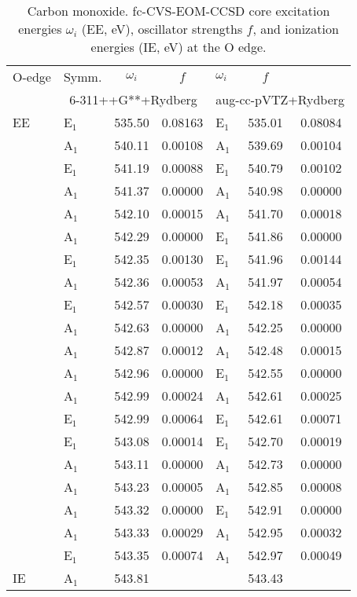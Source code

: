 \documentclass[journal=jctcce,manuscript=article]{achemso}
\begin{document}
\begin{table}
\caption{Carbon monoxide. fc-CVS-EOM-CCSD core excitation energies $\omega_i$ (EE, eV), oscillator strengths $f$, and ionization 
energies (IE, eV) at the O edge.
\label{Tab:CO}}
\scriptsize
\begin{tabular}{l|lcc|lcc}
\hline
O-edge & Symm. & $\omega_i$ & $f$ 
       & $\omega_i$ & $f$ \\
        \cline{2-7}
      & \multicolumn{3}{c|}{6-311++G**+Rydberg}
      & \multicolumn{3}{c}{aug-cc-pVTZ+Rydberg} \\

\hline
EE 
& E$_1$ & 535.50 & 0.08163 & E$_1$ & 535.01 & 0.08084 \\
& A$_1$ & 540.11 & 0.00108 & A$_1$ & 539.69 & 0.00104 \\
& E$_1$ & 541.19 & 0.00088 & E$_1$ & 540.79 & 0.00102 \\
& A$_1$ & 541.37 & 0.00000 & A$_1$ & 540.98 & 0.00000 \\
& A$_1$ & 542.10 & 0.00015 & A$_1$ & 541.70 & 0.00018 \\
& A$_1$ & 542.29 & 0.00000 & E$_1$ & 541.86 & 0.00000 \\
& E$_1$ & 542.35 & 0.00130 & E$_1$ & 541.96 & 0.00144 \\
& A$_1$ & 542.36 & 0.00053 & A$_1$ & 541.97 & 0.00054 \\
& E$_1$ & 542.57 & 0.00030 & E$_1$ & 542.18 & 0.00035 \\
& A$_1$ & 542.63 & 0.00000 & A$_1$ & 542.25 & 0.00000 \\
& A$_1$ & 542.87 & 0.00012 & A$_1$ & 542.48 & 0.00015 \\
& A$_1$ & 542.96 & 0.00000 & E$_1$ & 542.55 & 0.00000 \\
& A$_1$ & 542.99 & 0.00024 & A$_1$ & 542.61 & 0.00025 \\
& E$_1$ & 542.99 & 0.00064 & E$_1$ & 542.61 & 0.00071 \\
& E$_1$ & 543.08 & 0.00014 & E$_1$ & 542.70 & 0.00019 \\
& A$_1$ & 543.11 & 0.00000 & A$_1$ & 542.73 & 0.00000 \\
& A$_1$ & 543.23 & 0.00005 & A$_1$ & 542.85 & 0.00008 \\
& A$_1$ & 543.32 & 0.00000 & E$_1$ & 542.91 & 0.00000 \\
& A$_1$ & 543.33 & 0.00029 & A$_1$ & 542.95 & 0.00032 \\
& E$_1$ & 543.35 & 0.00074 & A$_1$ & 542.97 & 0.00049 \\
\hline
IE & A$_1$ & 543.81& 
   && 543.43 &  \\
\hline
  \end{tabular}
\end{table}
\end{document}
